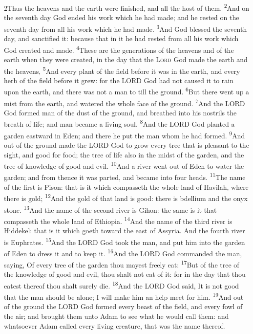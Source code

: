 \documentclass[10pt,oneside,a4paper]{memoir}
\renewcommand{\verse}[1]{\textsuperscript{#1}}
\begin{document}
\begin{paracol}{2}
\switchcolumn
\lettrine{2}Thus the heavens and the earth were finished, and all the host of them.  
\verse{2}And on the seventh day God ended his work which he had made; and he rested on the seventh day from all his work which he had made.  
\verse{3}And God blessed the seventh day, and sanctified it: because that in it he had rested from all his work which God created and made.  
\verse{4}These are the generations of the heavens and of the earth when they were created, in the day that the \textsc{Lord} God made the earth and the heavens, 
\verse{5}And every plant of the field before it was in the earth, and every herb of the field before it grew: for the LORD God had not caused it to rain upon the earth, and there was not a man to till the ground.  
\verse{6}But there went up a mist from the earth, and watered the whole face of the ground.  
\verse{7}And the LORD God formed man of the dust of the ground, and breathed into his nostrils the breath of life; and man became a living soul.  
\verse{8}And the LORD God planted a garden eastward in Eden; and there he put the man whom he had formed.  
\verse{9}And out of the ground made the LORD God to grow every tree that is pleasant to the sight, and good for food; the tree of life also in the midst of the garden, and the tree of knowledge of good and evil.  
\verse{10}And a river went out of Eden to water the garden; and from thence it was parted, and became into four heads.  
\verse{11}The name of the first is Pison: that is it which compasseth the whole land of Havilah, where there is gold; 
\verse{12}And the gold of that land is good: there is bdellium and the onyx stone.  
\verse{13}And the name of the second river is Gihon: the same is it that compasseth the whole land of Ethiopia.  
\verse{14}And the name of the third river is Hiddekel: that is it which goeth toward the east of Assyria. And the fourth river is Euphrates.  
\verse{15}And the LORD God took the man, and put him into the garden of Eden to dress it and to keep it.  
\verse{16}And the LORD God commanded the man, saying, Of every tree of the garden thou mayest freely eat: 
\verse{17}But of the tree of the knowledge of good and evil, thou shalt not eat of it: for in the day that thou eatest thereof thou shalt surely die.  
\verse{18}And the LORD God said, It is not good that the man should be alone; I will make him an help meet for him.  
\verse{19}And out of the ground the LORD God formed every beast of the field, and every fowl of the air; and brought them unto Adam to see what he would call them: and whatsoever Adam called every living creature, that was the name thereof.  

\end{paracol}
\end{document}
